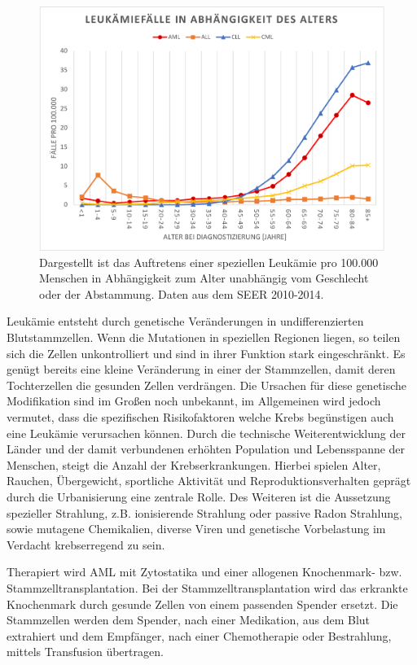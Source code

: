 \begin{figure}
\centering
\includegraphics[width=.99\textwidth]{images/Age_AML_ALL.pdf}
\caption{Dargestellt ist das Auftretens einer speziellen Leukämie pro 100.000 Menschen in Abhängigkeit zum Alter unabhängig vom Geschlecht oder der Abstammung. Daten aus dem SEER 2010-2014.}
\label{fig:Age_AML_ALL}
\end{figure}

Leukämie entsteht durch genetische Veränderungen in undifferenzierten Blutstammzellen. Wenn die Mutationen in speziellen Regionen liegen\cite{Wakita.2016}, so teilen sich die Zellen unkontrolliert und sind in ihrer Funktion stark eingeschränkt. Es genügt bereits eine kleine Veränderung in einer der Stammzellen, damit deren Tochterzellen die gesunden Zellen verdrängen. Die Ursachen für diese genetische Modifikation sind im Großen noch unbekannt, im Allgemeinen wird jedoch vermutet, dass die spezifischen Risikofaktoren welche Krebs begünstigen auch eine Leukämie verursachen können\cite{Petit.2014}. Durch die technische Weiterentwicklung der Länder und der damit verbundenen erhöhten Population und Lebensspanne der Menschen, steigt die Anzahl der Krebserkrankungen. Hierbei spielen Alter, Rauchen, Übergewicht, sportliche Aktivität und Reproduktionsverhalten geprägt durch die Urbanisierung eine zentrale Rolle\cite{Torre.2015}. Des Weiteren ist die Aussetzung spezieller Strahlung, z.B. ionisierende Strahlung oder passive Radon Strahlung, sowie mutagene Chemikalien, diverse Viren und genetische Vorbelastung im Verdacht krebserregend zu sein.

Therapiert wird \ac{AML} mit Zytostatika und einer allogenen Knochenmark- bzw. Stammzelltransplantation\cite{Cheson.2003}. Bei der Stamm\-zell\-trans\-plan\-tat\-ion wird das erkrankte Knochenmark durch gesunde Zellen von einem passenden Spender ersetzt. Die Stammzellen werden dem Spender, nach einer Medikation, aus dem Blut extrahiert und dem Empfänger, nach einer Chemotherapie oder Bestrahlung, mittels Transfusion übertragen. 

